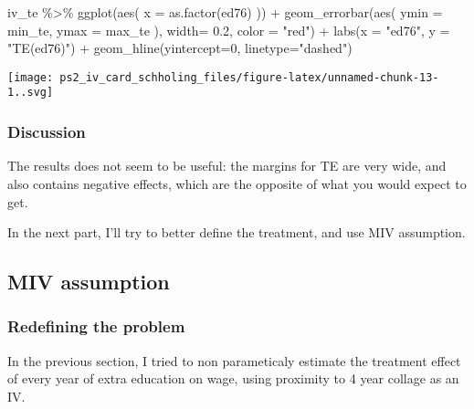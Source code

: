 \documentclass[
]{article}
\newenvironment{Shaded}{\begin{snugshade}}{\end{snugshade}}
\newcommand{\AttributeTok}[1]{\textcolor[rgb]{0.77,0.63,0.00}{#1}}
\newcommand{\DecValTok}[1]{\textcolor[rgb]{0.00,0.00,0.81}{#1}}
\newcommand{\FloatTok}[1]{\textcolor[rgb]{0.00,0.00,0.81}{#1}}
\newcommand{\FunctionTok}[1]{\textcolor[rgb]{0.00,0.00,0.00}{#1}}
\newcommand{\NormalTok}[1]{#1}
\newcommand{\SpecialCharTok}[1]{\textcolor[rgb]{0.00,0.00,0.00}{#1}}
\newcommand{\StringTok}[1]{\textcolor[rgb]{0.31,0.60,0.02}{#1}}
\begin{document}
\begin{Shaded}
\begin{Highlighting}[]
\NormalTok{iv\_te }\SpecialCharTok{\%\textgreater{}\%} \FunctionTok{ggplot}\NormalTok{(}\FunctionTok{aes}\NormalTok{(}
  \AttributeTok{x =} \FunctionTok{as.factor}\NormalTok{(ed76)}
\NormalTok{)) }\SpecialCharTok{+} \FunctionTok{geom\_errorbar}\NormalTok{(}\FunctionTok{aes}\NormalTok{(}
  \AttributeTok{ymin =}\NormalTok{ min\_te,}
  \AttributeTok{ymax =}\NormalTok{ max\_te}
\NormalTok{), }\AttributeTok{width=} \FloatTok{0.2}\NormalTok{, }\AttributeTok{color =} \StringTok{"red"}\NormalTok{) }\SpecialCharTok{+}
  \FunctionTok{labs}\NormalTok{(}\AttributeTok{x =} \StringTok{"ed76"}\NormalTok{, }\AttributeTok{y =} \StringTok{"TE(ed76)"}\NormalTok{) }\SpecialCharTok{+}
  \FunctionTok{geom\_hline}\NormalTok{(}\AttributeTok{yintercept=}\DecValTok{0}\NormalTok{, }\AttributeTok{linetype=}\StringTok{"dashed"}\NormalTok{)}
\end{Highlighting}
\end{Shaded}

\texttt{[image: ps2\_iv\_card\_schholing\_files/figure-latex/unnamed-chunk-13-1..svg]}

\hypertarget{discussion}{%
\subsubsection{Discussion}\label{discussion}}

The results does not seem to be useful: the margins for TE are very
wide, and also contains negative effects, which are the opposite of what
you would expect to get.

In the next part, I'll try to better define the treatment, and use MIV
assumption.

\hypertarget{miv-assumption}{%
\subsection{MIV assumption}\label{miv-assumption}}

\hypertarget{redefining-the-problem}{%
\subsubsection{Redefining the problem}\label{redefining-the-problem}}

In the previous section, I tried to non parameticaly estimate the
treatment effect of every year of extra education on wage, using
proximity to 4 year collage as an IV.
\end{document}
